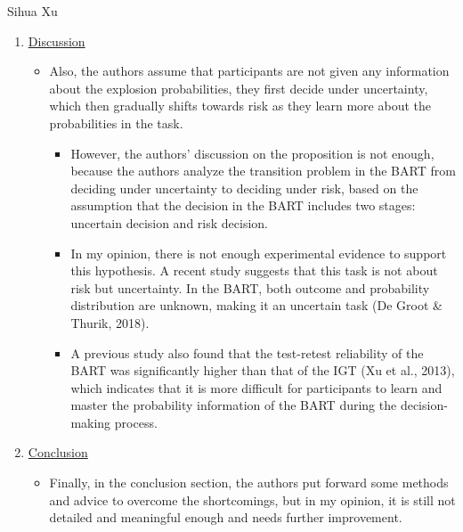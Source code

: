 \documentclass[serif, twocolumn, review]{jote-article}
\begin{document}
\begin{paracol}{2}
\begin{reviewend}{Sihua Xu}
\begin{enumerate}[label=\textbf{\arabic*}), start=0]
    \item \hyperref[sec:discussion]{Discussion}
        \begin{itemize}
            \item Also, the authors assume that participants are not given any information about the explosion probabilities, they first decide under uncertainty, which then gradually shifts towards risk as they learn more about the probabilities in the task. 
            \begin{itemize}
                \item However, the authors’ discussion on the proposition is not enough, because the authors analyze the transition problem in the BART from deciding under uncertainty to deciding under risk, based on the assumption that the decision in the BART includes two stages: uncertain decision and risk decision. 
                \item In my opinion, there is not enough experimental evidence to support this hypothesis. A recent study suggests that this task is not about risk but uncertainty. In the BART, both outcome and probability distribution are unknown, making it an uncertain task (De Groot \& Thurik, 2018).
                \item A previous study also found that the test-retest reliability of the BART was significantly higher than that of the IGT (Xu et al., 2013), which indicates that it is more difficult for participants to learn and master the probability information of the BART during the decision-making process.
            \end{itemize}
        \end{itemize}
    \item \hyperref[sec:conclusion]{Conclusion}
        \begin{itemize}
            \item Finally, in the conclusion section, the authors put forward some methods and advice to overcome the shortcomings, but in my opinion, it is still not detailed and meaningful enough and needs further improvement.
        \end{itemize}
    \end{enumerate}
\end{reviewend}
\end{paracol}
\end{document}
